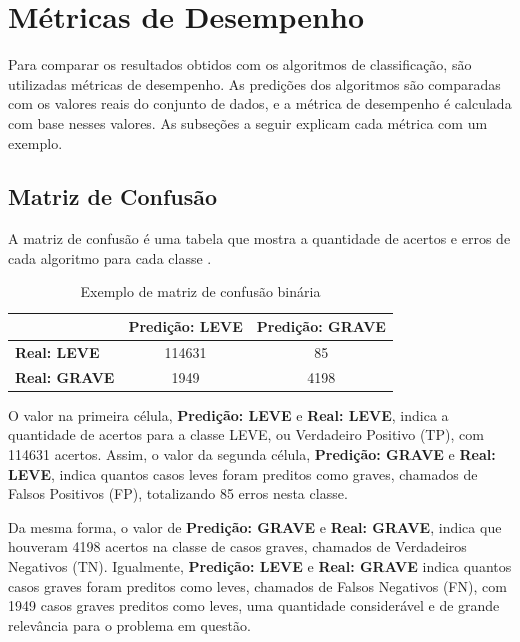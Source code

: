 \section{Métricas de Desempenho}
\label{sec:metricas}

Para comparar os resultados obtidos com os algoritmos de classificação, são utilizadas métricas de desempenho. As predições dos algoritmos são comparadas com os valores reais do conjunto de dados, e a métrica de desempenho é calculada com base nesses valores. As subseções a seguir explicam cada métrica com um exemplo.

\subsection{Matriz de Confusão}
\label{subsec:matriz-confusao}

A matriz de confusão é uma tabela que mostra a quantidade de acertos e erros de cada algoritmo para cada classe \cite{confusion}.

\begin{table}[H] 
  \centering
  \begin{tabular}{l|c|c|}
    \cline{2-3}
    \textbf{}                         & \multicolumn{1}{l|}{\textbf{Predição: LEVE}} & \multicolumn{1}{l|}{\textbf{Predição: GRAVE}} \\ \hline
    \multicolumn{1}{|l|}{\textbf{Real: LEVE}}  & 114631                                       & 85                                            \\ \hline
    \multicolumn{1}{|l|}{\textbf{Real: GRAVE}} & 1949                                         & 4198                                          \\ \hline
  \end{tabular}
  \caption{Exemplo de matriz de confusão binária}
  \label{tbl:tabela-matriz-confusao-metricas} 
\end{table}

O valor na primeira célula, \textbf{Predição: LEVE} e \textbf{Real: LEVE}, indica a quantidade de acertos para a classe LEVE, ou Verdadeiro Positivo (TP), com 114631 acertos. Assim, o valor da segunda célula, \textbf{Predição: GRAVE} e \textbf{Real: LEVE}, indica quantos casos leves foram preditos como graves, chamados de Falsos Positivos (FP), totalizando 85 erros nesta classe.

Da mesma forma, o valor de \textbf{Predição: GRAVE} e \textbf{Real: GRAVE}, indica que houveram 4198 acertos na classe de casos graves, chamados de Verdadeiros Negativos (TN). Igualmente, \textbf{Predição: LEVE} e \textbf{Real: GRAVE} indica quantos casos graves foram preditos como leves, chamados de Falsos Negativos (FN), com 1949 casos graves preditos como leves, uma quantidade considerável e de grande relevância para o problema em questão.

